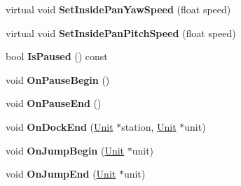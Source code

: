 \begin{DoxyCompactItemize}
\item 
virtual void {\bfseries Set\+Inside\+Pan\+Yaw\+Speed} (float speed)\hypertarget{classGameCockpit_a9ecfe087be123aaecc4634e86cbe4fea}{}\label{classGameCockpit_a9ecfe087be123aaecc4634e86cbe4fea}

\item 
virtual void {\bfseries Set\+Inside\+Pan\+Pitch\+Speed} (float speed)\hypertarget{classGameCockpit_aa37db680f9456f2bfd57b052e345616d}{}\label{classGameCockpit_aa37db680f9456f2bfd57b052e345616d}

\item 
bool {\bfseries Is\+Paused} () const \hypertarget{classGameCockpit_ab33b7410f7dfb368161d534613e474e7}{}\label{classGameCockpit_ab33b7410f7dfb368161d534613e474e7}

\item 
void {\bfseries On\+Pause\+Begin} ()\hypertarget{classGameCockpit_a96fd319de470514178397f6f88f3c1eb}{}\label{classGameCockpit_a96fd319de470514178397f6f88f3c1eb}

\item 
void {\bfseries On\+Pause\+End} ()\hypertarget{classGameCockpit_acc911cf89c9cd5bfaffb5c9094d20c0a}{}\label{classGameCockpit_acc911cf89c9cd5bfaffb5c9094d20c0a}

\item 
void {\bfseries On\+Dock\+End} (\hyperlink{classUnit}{Unit} $\ast$station, \hyperlink{classUnit}{Unit} $\ast$unit)\hypertarget{classGameCockpit_a69edc289d43ae27462c1abdbc9505272}{}\label{classGameCockpit_a69edc289d43ae27462c1abdbc9505272}

\item 
void {\bfseries On\+Jump\+Begin} (\hyperlink{classUnit}{Unit} $\ast$unit)\hypertarget{classGameCockpit_a97bf221652b18494320120630ba3f842}{}\label{classGameCockpit_a97bf221652b18494320120630ba3f842}

\item 
void {\bfseries On\+Jump\+End} (\hyperlink{classUnit}{Unit} $\ast$unit)\hypertarget{classGameCockpit_aa3faf6d973a33aa7af097edf3ad7811c}{}\label{classGameCockpit_aa3faf6d973a33aa7af097edf3ad7811c}

\end{DoxyCompactItemize}
